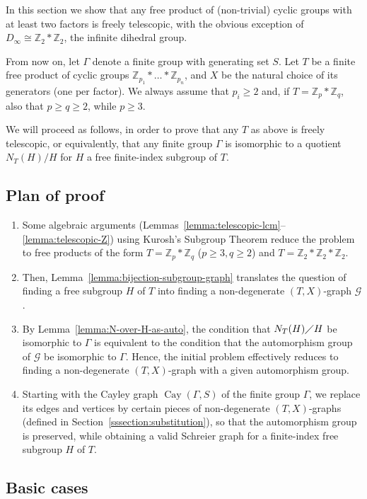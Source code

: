 \documentclass[10pt,a4paper]{amsart}
\theoremstyle{definition}
\newcommand{\ZZ}{\mathbb{Z}}
\newcommand{\cG}{\mathcal{G}}
\DeclareMathOperator{\Cay}{Cay}
\begin{document}
In this section we show that any free product of (non-trivial) cyclic groups with at least two factors is freely telescopic, with the obvious exception of $D_\infty \cong \ZZ_2*\ZZ_2$, the infinite dihedral group.

From now on, let ${\Gamma}$ denote a finite group with generating set $S$. Let $T$ be a finite free product of cyclic groups $\ZZ_{p_1}*\dots*\ZZ_{p_n}$, and $X$ be the natural choice of its generators (one per factor). We always assume that $p_i \geq 2$ and, if $T=\ZZ_p*\ZZ_q$, also that $p \geq q \geq 2$, while $p \geq 3$. 

We will proceed as follows, in order to prove that any $T$ as above is freely telescopic, or equivalently, that any finite group ${\Gamma}$ is isomorphic to a quotient $N_T(H)/H$ for $H$ a free finite-index subgroup of $T$.

\subsection{Plan of proof}\label{proof-plan}
\begin{enumerate}
\item Some algebraic arguments (Lemmas~\ref{lemma:telescopic-lcm}--\ref{lemma:telescopic-Z}) using Kurosh's Subgroup Theorem reduce the problem to free products of the form $T=\ZZ_p*\ZZ_q$ ($p \geq 3, q \geq 2$) and $T=\ZZ_2*\ZZ_2*\ZZ_2$.
\item Then, Lemma~\ref{lemma:bijection-subgroup-graph} translates the question of finding a free subgroup $H$ of $T$ into finding a non-degenerate $(T,X)$-graph $\cG$.
\item By Lemma~\ref{lemma:N-over-H-as-auto}, the condition that $N_T(H)\diagup H$ be isomorphic to ${\Gamma}$ is equivalent to the condition that the automorphism group of $\cG$ be isomorphic to ${\Gamma}$. Hence, the initial problem effectively reduces to finding a non-degenerate $(T,X)$-graph with a given automorphism group.
\item Starting with the Cayley graph $\Cay({\Gamma},S)$ of the finite group $\Gamma$, we replace its edges and vertices by certain pieces of non-degenerate $(T,X)$-graphs (defined in Section~\ref{sssection:substitution}), so that the automorphism group is preserved, while obtaining a valid Schreier graph for a finite-index free subgroup $H$ of $T$. 
\end{enumerate}

\subsection{Basic cases} \label{section:basiccases}
\end{document}
